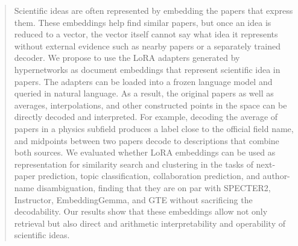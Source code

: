 \begin{abstract}
Scientific ideas are often represented by embedding the papers that express them. These embeddings help find similar papers, but once an idea is reduced to a vector, the vector itself cannot say what idea it represents without external evidence such as nearby papers or a separately trained decoder. We propose to use the LoRA adapters generated by hypernetworks as document embeddings that represent scientific idea in papers. The adapters can be loaded into a frozen language model and queried in natural language. As a result, the original papers as well as averages, interpolations, and other constructed points in the space can be directly decoded and interpreted. 
For example, decoding the average of papers in a physics subfield produces a label close to the official field name, and midpoints between two papers decode to descriptions that combine both sources.
We evaluated whether LoRA embeddings can be used as representation for similarity search and clustering in the tasks of next-paper prediction, topic classification, collaboration prediction, and author-name disambiguation, finding that they are on par with SPECTER2, Instructor, EmbeddingGemma, and GTE without sacrificing the decodability. 
Our results show that these embeddings allow not only retrieval but also direct and arithmetic interpretability and operability of scientific ideas.
\end{abstract}
